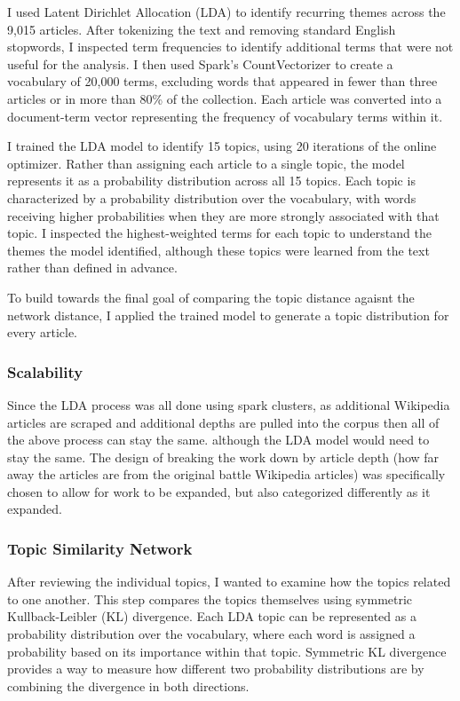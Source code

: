 \documentclass[
  letterpaper,
  DIV=11,
  numbers=noendperiod]{scrartcl}
\begin{document}
I used Latent Dirichlet Allocation (LDA) to identify recurring themes
across the 9,015 articles. After tokenizing the text and removing
standard English stopwords, I inspected term frequencies to identify
additional terms that were not useful for the analysis. I then used
Spark's CountVectorizer to create a vocabulary of 20,000 terms,
excluding words that appeared in fewer than three articles or in more
than 80\% of the collection. Each article was converted into a
document-term vector representing the frequency of vocabulary terms
within it.

I trained the LDA model to identify 15 topics, using 20 iterations of
the online optimizer. Rather than assigning each article to a single
topic, the model represents it as a probability distribution across all
15 topics. Each topic is characterized by a probability distribution
over the vocabulary, with words receiving higher probabilities when they
are more strongly associated with that topic. I inspected the
highest-weighted terms for each topic to understand the themes the model
identified, although these topics were learned from the text rather than
defined in advance.

To build towards the final goal of comparing the topic distance agaisnt
the network distance, I applied the trained model to generate a topic
distribution for every article.

\subsubsection{Scalability}\label{scalability}

Since the LDA process was all done using spark clusters, as additional
Wikipedia articles are scraped and additional depths are pulled into the
corpus then all of the above process can stay the same. although the LDA
model would need to stay the same. The design of breaking the work down
by article depth (how far away the articles are from the original battle
Wikipedia articles) was specifically chosen to allow for work to be
expanded, but also categorized differently as it expanded.

\subsubsection{Topic Similarity Network}\label{topic-similarity-network}

After reviewing the individual topics, I wanted to examine how the
topics related to one another. This step compares the topics themselves
using symmetric Kullback-Leibler (KL) divergence. Each LDA topic can be
represented as a probability distribution over the vocabulary, where
each word is assigned a probability based on its importance within that
topic. Symmetric KL divergence provides a way to measure how different
two probability distributions are by combining the divergence in both
directions.
\end{document}

